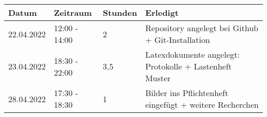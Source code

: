 \begin{tabular}{|l|l|l|l|}
\hline
Datum & Zeitraum & Stunden & Erledigt \\
\hline
    22.04.2022 & 12:00 - 14:00 & 2 & Repository angelegt bei Github +  Git-Installation\\
    23.04.2022 & 18:30 - 22:00 & 3,5 & Latexdokumente angelegt: Protokolle + Lastenheft Muster \\
    28.04.2022 & 17:30 - 18:30 & 1 & Bilder ins Pflichtenheft eingefügt + weitere Recherchen\\
\hline
\end{tabular}
